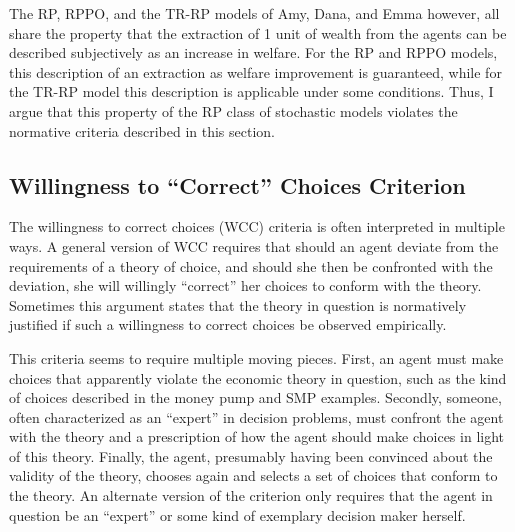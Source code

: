 \documentclass[../main.tex]{subfiles}
\begin{document}
The RP, RPPO, and the TR-RP models of Amy, Dana, and Emma however, all share the property that the extraction of 1 unit of wealth from the agents can be described subjectively as an increase in welfare.
For the RP and RPPO models, this description of an extraction as welfare improvement is guaranteed, while for the TR-RP model this description is applicable under some conditions.
Thus, I argue that this property of the RP class of stochastic models violates the normative criteria described in this section.

\singlespacing
\subsection{Willingness to \enquote{Correct} Choices Criterion}
\doublespacing

The willingness to correct choices (WCC) criteria is often interpreted in multiple ways.
A general version of WCC requires that should an agent deviate from the requirements of a theory of choice, and should she then be confronted with the deviation, she will willingly \enquote{correct} her choices to conform with the theory.
Sometimes this argument states that the theory in question is normatively justified if such a willingness to correct choices be observed empirically.

This criteria seems to require multiple moving pieces.
First, an agent must make choices that apparently violate the economic theory in question, such as the kind of choices described in the money pump and SMP examples.
Secondly, someone, often characterized as an \enquote{expert} in decision problems, must confront the agent with the theory and a prescription of how the agent should make choices in light of this theory.
Finally, the agent, presumably having been convinced about the validity of the theory, chooses again and selects a set of choices that conform to the theory.
An alternate version of the criterion only requires that the agent in question be an \enquote{expert} or some kind of exemplary decision maker herself.
\end{document}
